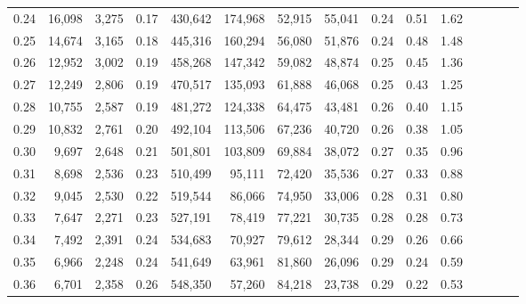 \begin{tabular}{rrrcrrrrrrrrrrr}
0.24 &  16,098 &  3,275 &                                       0.17 &  430,642 &  174,968 &   52,915 &   55,041 &  0.24 &  0.51 &                         1.62 \\
0.25 &  14,674 &  3,165 &                                       0.18 &  445,316 &  160,294 &   56,080 &   51,876 &  0.24 &  0.48 &                         1.48 \\
0.26 &  12,952 &  3,002 &                                       0.19 &  458,268 &  147,342 &   59,082 &   48,874 &  0.25 &  0.45 &                         1.36 \\
0.27 &  12,249 &  2,806 &                                       0.19 &  470,517 &  135,093 &   61,888 &   46,068 &  0.25 &  0.43 &                         1.25 \\
0.28 &  10,755 &  2,587 &                                       0.19 &  481,272 &  124,338 &   64,475 &   43,481 &  0.26 &  0.40 &                         1.15 \\
0.29 &  10,832 &  2,761 &                                       0.20 &  492,104 &  113,506 &   67,236 &   40,720 &  0.26 &  0.38 &                         1.05 \\
0.30 &   9,697 &  2,648 &                                       0.21 &  501,801 &  103,809 &   69,884 &   38,072 &  0.27 &  0.35 &                         0.96 \\
0.31 &   8,698 &  2,536 &                                       0.23 &  510,499 &   95,111 &   72,420 &   35,536 &  0.27 &  0.33 &                         0.88 \\
0.32 &   9,045 &  2,530 &                                       0.22 &  519,544 &   86,066 &   74,950 &   33,006 &  0.28 &  0.31 &                         0.80 \\
0.33 &   7,647 &  2,271 &                                       0.23 &  527,191 &   78,419 &   77,221 &   30,735 &  0.28 &  0.28 &                         0.73 \\
0.34 &   7,492 &  2,391 &                                       0.24 &  534,683 &   70,927 &   79,612 &   28,344 &  0.29 &  0.26 &                         0.66 \\
0.35 &   6,966 &  2,248 &                                       0.24 &  541,649 &   63,961 &   81,860 &   26,096 &  0.29 &  0.24 &                         0.59 \\
0.36 &   6,701 &  2,358 &                                       0.26 &  548,350 &   57,260 &   84,218 &   23,738 &  0.29 &  0.22 &                         0.53 \\

\end{tabular}

